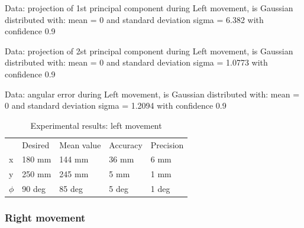 \documentclass[a4paper, 12pt]{article}
\begin{document}
Data: projection of 1st principal component during  Left movement, is Gaussian distributed with: mean = 0 and standard deviation sigma = 6.382 with confidence 0.9%





\smallskip

Data: projection of 2st principal component during  Left movement, is Gaussian distributed with: mean = 0 and standard deviation sigma = 1.0773 with confidence 0.9%





\smallskip


Data: angular error during   Left movement, is Gaussian distributed with: mean = 0 and standard deviation sigma = 1.2094 with confidence 0.9%

\begin{table}[!h]
\centering
\caption{Experimental results: left movement}
\begin{tabular}{lllll}
     & Desired & Mean value & Accuracy & Precision \\
x    &  180  mm     &    144  mm      &    36  mm    &     6  mm    \\
y    &  250 mm     &    245  mm     &  5    mm    &    1   mm    \\
$\phi$ &  90   deg    &     85    deg   &     5 deg     & 1 deg
\end{tabular}
\end{table}

\newpage
\subsubsection{Right movement}
\end{document}
